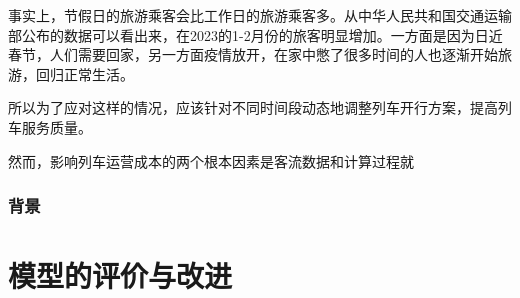 事实上，节假日的旅游乘客会比工作日的旅游乘客多。从中华人民共和国交通运输部公布的数据可以看出来，在2023的1-2月份的旅客明显增加\cite{ChengShiKeYunTongJiShuJuZhongHuaRenMinGongHeGuoJiaoTongYunShuBu}。一方面是因为日近春节，人们需要回家，另一方面疫情放开，在家中憋了很多时间的人也逐渐开始旅游，回归正常生活。

所以为了应对这样的情况，应该针对不同时间段动态地调整列车开行方案，提高列车服务质量。

然而，影响列车运营成本的两个根本因素是客流数据和计算过程就

\subsubsection{背景}


%
%

\section{模型的评价与改进}

